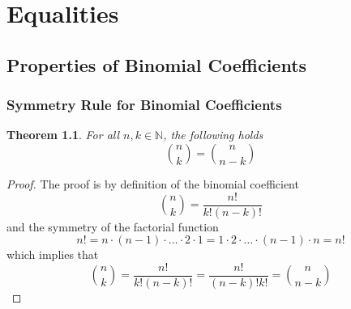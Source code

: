 \documentclass[11pt]{book} %
\newtheorem{theorem}{Theorem}[section]
\begin{document}
\chapter{Equalities}

\section{Properties of Binomial Coefficients}

\subsection{Symmetry Rule for Binomial Coefficients}

\begin{boxA}
    \begin{theorem}
        For all $n, k \in \mathbb{N}$, the following holds
        \begin{equation}
            \binom{n}{k} = \binom{n}{n-k}
        \end{equation}
    \end{theorem}
\end{boxA}

\begin{proof}
    The proof is by definition of the binomial coefficient
    \begin{equation}
        \binom{n}{k} = \frac{n!}{k!(n-k)!}
    \end{equation}
    and the symmetry of the factorial function
    \begin{equation}
        n! = n \cdot (n-1) \cdot \ldots \cdot 2 \cdot 1 = 1 \cdot 2 \cdot \ldots \cdot (n-1) \cdot n = n!
    \end{equation}
    which implies that
    \begin{equation}
        \binom{n}{k} = \frac{n!}{k!(n-k)!} = \frac{n!}{(n-k)!k!} = \binom{n}{n-k}
    \end{equation}
\end{proof}
\end{document}
